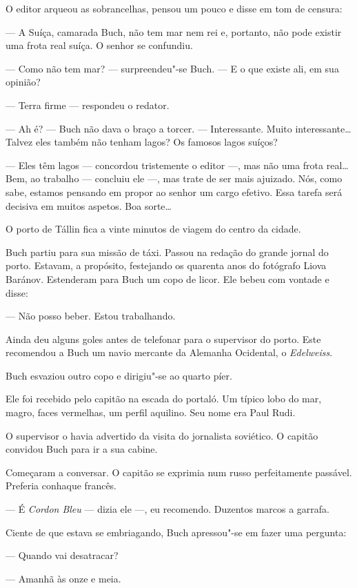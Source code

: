 O editor arqueou as sobrancelhas, pensou um pouco e disse em tom de
censura:

--- A Suíça, camarada Buch, não tem mar nem rei e, portanto, não pode
existir uma frota real suíça. O senhor se confundiu.

--- Como não tem mar? --- surpreendeu"-se Buch. --- E o que existe ali,
em sua opinião?

--- Terra firme --- respondeu o redator.

--- Ah é? --- Buch não dava o braço a torcer. --- Interessante. Muito
interessante\ldots{} Talvez eles também não tenham lagos? Os famosos lagos
suíços?

--- Eles têm lagos --- concordou tristemente o editor ---, mas não uma
frota real\ldots{} Bem, ao trabalho --- concluiu ele ---, mas trate de ser
mais ajuizado. Nós, como sabe, estamos pensando em propor ao senhor um
cargo efetivo. Essa tarefa será decisiva em muitos aspetos. Boa sorte\ldots{}

O porto de Tállin fica a vinte minutos de viagem do centro da cidade.

Buch partiu para sua missão de táxi. Passou na redação do grande jornal
do porto. Estavam, a propósito, festejando os quarenta anos do fotógrafo
Liova Baránov. Estenderam para Buch um copo de licor. Ele bebeu com
vontade e disse:

--- Não posso beber. Estou trabalhando.

Ainda deu alguns goles antes de telefonar para o supervisor do porto.
Este recomendou a Buch um navio mercante da Alemanha Ocidental, o
\emph{Edelweiss}.

Buch esvaziou outro copo e dirigiu"-se ao quarto píer.

Ele foi recebido pelo capitão na escada do portaló. Um típico lobo do
mar, magro, faces vermelhas, um perfil aquilino. Seu nome era Paul Rudi.

O supervisor o havia advertido da visita do jornalista soviético. O
capitão convidou Buch para ir a sua cabine.

Começaram a conversar. O capitão se exprimia num russo perfeitamente
passável. Preferia conhaque francês.

--- É \emph{Cordon Bleu} --- dizia ele ---, eu recomendo. Duzentos
marcos a garrafa.

Ciente de que estava se embriagando, Buch apressou"-se em fazer uma
pergunta:

--- Quando vai desatracar?

--- Amanhã às onze e meia.

